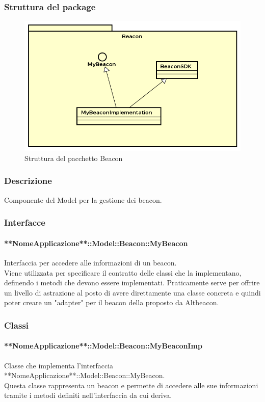 \documentclass[../SpecificaTecnica.tex]{subfiles}
\begin{document}
		\subsubsection{Struttura del package}
		\begin{figure}[!h]
			\centering
			\includegraphics[scale=0.6]{diagrammi/Beacon.png}
				\caption{Struttura del pacchetto Beacon}
			\label{fig:Struttura_MVP}
		\end{figure} 
		\subsubsection{Descrizione}
			Componente del Model per la gestione dei beacon.
		\subsubsection{Interfacce}
			\paragraph{**NomeApplicazione**::Model::Beacon::MyBeacon}
				Interfaccia per accedere alle informazioni di un beacon. \\ 
				Viene utilizzata per specificare il contratto delle classi che la implementano, definendo i metodi che devono essere implementati. Praticamente serve per offrire un livello di astrazione al posto di avere direttamente una classe concreta e quindi poter creare un "adapter" per il beacon della proposto da Altbeacon.
		\subsubsection{Classi}
			\paragraph{**NomeApplicazione**::Model::Beacon::MyBeaconImp}
				Classe che implementa l'interfaccia **NomeApplicazione**::Model::Beacon::MyBeacon. \\
				Questa classe rappresenta un beacon e permette di accedere alle sue informazioni tramite i metodi definiti nell'interfaccia da cui deriva.
\end{document}
